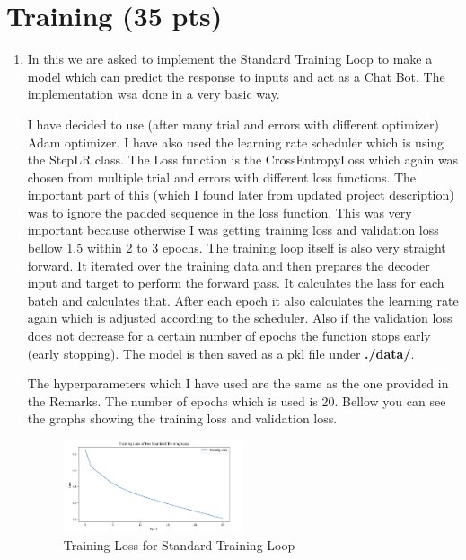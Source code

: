 \documentclass[a4paper]{article}
\begin{document}
\section{Training (35 pts)}
\begin{enumerate}
    \item In this we are asked to implement the Standard Training Loop to make a model which can predict the response to inputs and act as a Chat Bot. The implementation wsa done in a very basic way. 

          I have decided to use (after many trial and errors with different optimizer) Adam optimizer. I have also used the learning rate scheduler which is using the StepLR class. The Loss function is the CrossEntropyLoss which again was chosen from multiple trial and errors with different loss functions. The important part of this (which I found later from updated project description) was to ignore the padded sequence in the loss function. This was very important because otherwise I was getting training loss and validation loss bellow 1.5 within 2 to 3 epochs. The training loop itself is also very straight forward. It iterated over the training data and then prepares the decoder input and target to perform the forward pass. It calculates the lass for each batch and calculates that. After each epoch it also calculates the learning rate again which is adjusted according to the scheduler. Also if the validation loss does not decrease for a certain number of epochs the function stops early (early stopping). The model is then saved as a pkl file under \textbf{./data/}.

          The hyperparameters which I have used are the same as the one provided in the Remarks. The number of epochs which is used is 20. Bellow you can see the graphs showing the training loss and validation loss.

          \begin{figure}[H]
              \centering
              \includegraphics[width=0.5\textwidth]{"../data/training_loss_simple_training_loop.png"}
              \caption{Training Loss for Standard Training Loop}
              \label{fig:my_label}
          \end{figure}


\end{enumerate}
\end{document}
